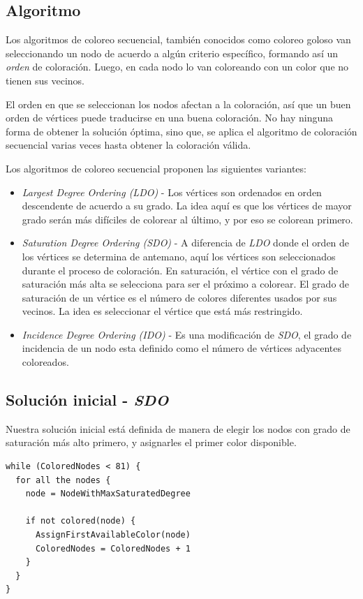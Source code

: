 \documentclass[a4paper,spanish]{article}
\begin{document}
\subsection{Algoritmo}

Los algoritmos de coloreo secuencial, también conocidos como coloreo goloso van seleccionando un nodo
de acuerdo a algún criterio específico, formando así un \emph{orden} de coloración.
Luego, en cada nodo lo van coloreando con un color que no tienen sus vecinos.
 
El orden en que se seleccionan los nodos afectan a la coloración, así que un buen orden de
vértices puede traducirse en una buena coloración. No hay ninguna forma de obtener la solución óptima,
sino que, se aplica el algoritmo de coloración secuencial varias veces hasta obtener la coloración válida.
 
​Los algoritmos de coloreo secuencial proponen las siguientes variantes:
 
\begin{itemize}
	\item \emph{Largest Degree Ordering (LDO)} - Los vértices son ordenados en orden descendente de acuerdo a su grado. La idea aquí  es que los vértices de mayor grado serán más difíciles de colorear al último, y por eso se colorean primero.
	\item \emph{Saturation Degree Ordering (SDO)} - A diferencia de \emph{LDO} donde el orden de los vértices se determina de antemano, aquí los vértices son seleccionados durante el proceso de coloración. En saturación, el vértice con el grado de saturación más alta se selecciona para ser el próximo a colorear. El grado de saturación de un vértice es el número de colores diferentes usados por sus vecinos. La idea es seleccionar el vértice que está más restringido.
	\item \emph{Incidence Degree Ordering (IDO)} - Es una modificación de \emph{SDO}, el grado de incidencia de un nodo esta definido como el número de vértices adyacentes coloreados.
\end{itemize}
 

\subsection{Solución inicial - \emph{SDO}}

Nuestra solución inicial está definida de manera de elegir los nodos con
grado de saturación más alto primero, y asignarles el primer color disponible.

\begin{Verbatim}[samepage=true]
while (ColoredNodes < 81) {
  for all the nodes {
    node = NodeWithMaxSaturatedDegree

    if not colored(node) {
      AssignFirstAvailableColor(node)
  	  ColoredNodes = ColoredNodes + 1
    }
  }
}
\end{Verbatim}
\end{document}
